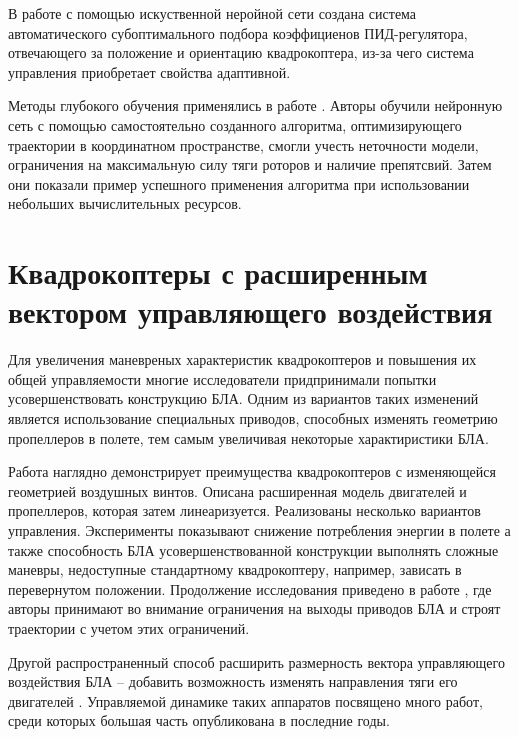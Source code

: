 В работе \cite{Evgenov01} с помощью искуственной неройной сети создана система автоматического субоптимального подбора коэффициенов ПИД-регулятора, отвечающего за положение и ориентацию квадрокоптера, из-за чего система управления приобретает свойства адаптивной.

Методы глубокого обучения применялись в работе \cite{Andersson01}. Авторы обучили нейронную сеть с помощью самостоятельно созданного алгоритма, оптимизирующего траектории в координатном пространстве, смогли учесть неточности модели, ограничения на максимальную силу тяги роторов и наличие препятсвий.
Затем они показали пример успешного применения алгоритма при использовании небольших вычислительных ресурсов.

\section{Квадрокоптеры с расширенным вектором управляющего воздействия}

Для увеличения маневреных характеристик квадрокоптеров и повышения их общей управляемости многие исследователи придпринимали попытки усовершенствовать конструкцию БЛА. Одним из вариантов таких изменений является использование специальных приводов, способных изменять геометрию пропеллеров в полете, тем самым увеличивая некоторые характиристики БЛА.

Работа \cite{Cutler01} наглядно демонстрирует преимущества квадрокоптеров с изменяющейся геометрией воздушных винтов. Описана расширенная модель двигателей и пропеллеров, которая затем линеаризуется. Реализованы несколько вариантов управления. Эксперименты показывают снижение потребления энергии в полете а также способность БЛА усовершенствованной конструкции выполнять сложные маневры, недоступные стандартному квадрокоптеру, например, зависать в перевернутом положении. Продолжение исследования приведено в работе \cite{Cutler02}, где авторы принимают во внимание ограничения на выходы приводов БЛА и строят траектории с учетом этих ограничений.

Другой распространенный способ расширить размерность вектора управляющего воздействия БЛА -- добавить возможность изменять направления тяги его двигателей \cite{Papachristos01, Gupta01, Lin01, Dharmawan01}. Управляемой динамике таких аппаратов посвящено много работ, среди которых большая часть опубликована в последние годы.

